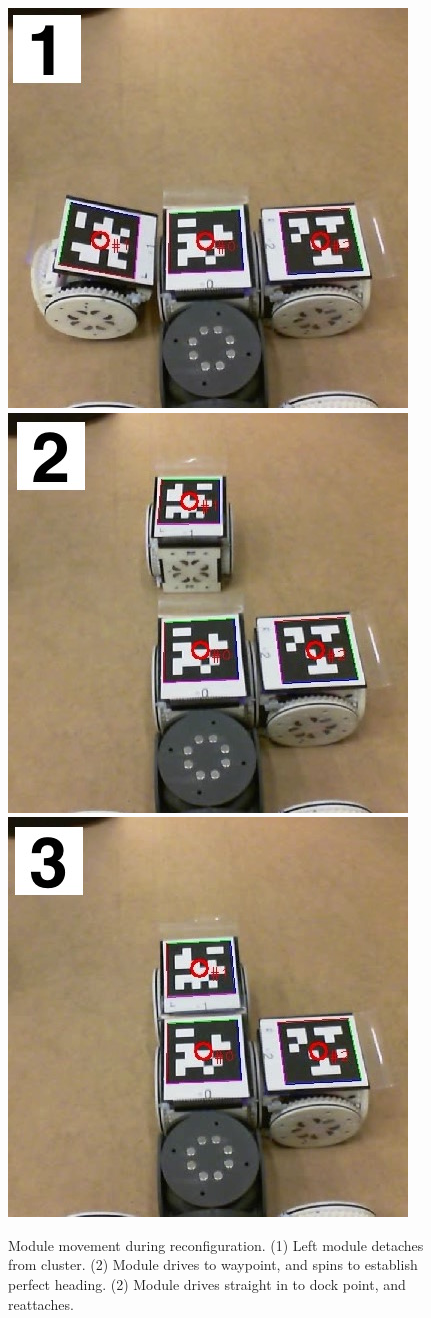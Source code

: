 \documentclass[conference]{IEEEtran}
\begin{document}
%
\begin{figure}[t]
\begin{center}
  \includegraphics[width=0.32\columnwidth]{images/reconf_detach.jpg}
  \includegraphics[width=0.32\columnwidth]{images/reconf_waypoint.jpg}
  \includegraphics[width=0.32\columnwidth]{images/reconf_attach.jpg}
  \caption{Module movement during reconfiguration. (1) Left module detaches from cluster. (2) Module drives to waypoint, and spins to establish perfect heading. (2) Module drives straight in to dock point, and reattaches.}
  \label{fig:reconf}
\end{center}
\end{figure}
\end{document}
